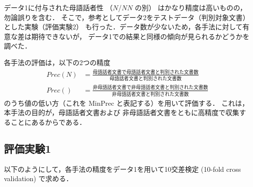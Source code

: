 \documentclass[japanese]{jnlp_1.4}
\newcommand{\NN}{}
\begin{document}
データ1に付与された母語話者性
（$N$/$N\!N$ の別）
はかなり精度は高いものの，勿論誤りを含む．
そこで，参考としてデータ2をテストデータ（判別対象文書）とした実験（評価実験2）
も行った．データ数が少ないため，各手法に対して有意な差は期待できないが，
データ1での結果と同様の傾向が見られるかどうかを調べた．

各手法の評価は，以下の2つの精度
\begin{align*}
 Prec(N)   &= \frac{母語話者文書で母語話者文書と判別された文書数}
                    {母語話者文書と判別された文書数}\\[4mm]
 Prec(\NN) &= \frac{非母語話者文書で非母語話者文書と判別された文書数}
                    {非母語話者文書と判別された文書数}
\end{align*}
のうち値の低い方（これを MinPrec と表記する）を用いて評価する．
これは，本手法の目的が，母語話者文書および
非母語話者文書をともに高精度で収集することにあるからである．


\subsection{評価実験1}

以下のようにして，各手法の精度をデータ1を用いて10交差検定
(10-fold cross validation)\cite{確率的言語モデルテキスト}
で求める．
\end{document}
